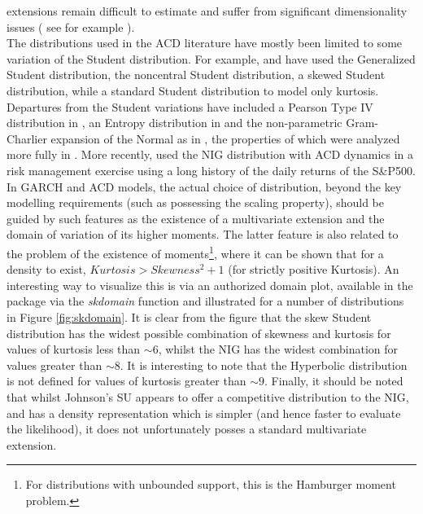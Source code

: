 extensions remain difficult to estimate and suffer from significant dimensionality issues ( see for example \citet{Jondeau2012} ).\\
The distributions used in the ACD literature have mostly been limited to some variation of the Student distribution. For example, \citet{Hansen1994}
and \citet{Jondeau2003} have used the Generalized Student distribution, \citet{Harvey1999} the noncentral Student distribution, \citet{Lambert2001} a
skewed Student distribution, while \citet{Brooks2005} a standard Student distribution to model only kurtosis. Departures from the Student variations
have included a Pearson Type IV distribution in \citet{Brannas2003}, an Entropy distribution in \citet{Rockinger2002} and the non-parametric Gram-Charlier
expansion of the Normal as in \citet{Leon2005}, the properties of which were analyzed more fully in \citet{Jondeau2001}. More recently, \citet{Wilhelmsson2009}
used the NIG distribution with ACD dynamics in a risk management exercise using a long history of the daily returns of the S\&P500. In GARCH and ACD models,
the actual choice of distribution, beyond the key modelling requirements (such as possessing the scaling property), should be guided by such features
as the existence of a multivariate extension and the domain of variation of its higher moments. The latter feature is also related to the problem of
the existence of moments\footnote{For distributions with unbounded support, this is the Hamburger moment problem.}, where it can be shown that
for a density to exist, $Kurtosis > {Skewness^2} + 1$ (for strictly positive Kurtosis). An interesting way to visualize this is via an authorized
domain plot, available in the \verb@rugarch@ package via the \emph{skdomain} function and illustrated for a number of distributions in
Figure \ref{fig:skdomain}. It is clear from the figure that the skew Student distribution has the widest possible combination of skewness
and kurtosis for values of kurtosis less than $\sim 6$, whilst the NIG has the widest combination for values greater than $\sim 8$. It is interesting
to note that the Hyperbolic distribution is not defined for values of kurtosis greater than $\sim 9$. Finally, it should be noted that whilst Johnson's SU
appears to offer a competitive distribution to the NIG, and has a density representation which is simpler (and hence faster to evaluate the likelihood),
it does not unfortunately posses a standard multivariate extension.\\
